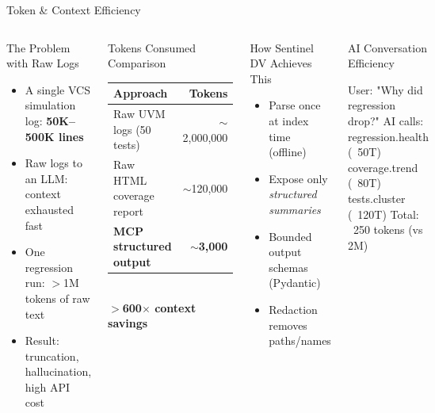 \documentclass[aspectratio=169,t]{beamer}
\begin{document}
\begin{frame}[fragile]{Token \& Context Efficiency}
  \begin{columns}[T]
      \begin{block}{The Problem with Raw Logs}
        \small
        \begin{itemize}
          \item A single VCS simulation log: \textbf{50K--500K lines}
          \item Raw logs to an LLM: context exhausted fast
          \item One regression run: $>$1M tokens of raw text
          \item Result: truncation, hallucination, high API cost
        \end{itemize}
      \end{block}
      \vspace{0.3em}
      \begin{alertblock}{Tokens Consumed Comparison}
        \footnotesize
        \begin{tabular}{lr}
          \toprule
          \textbf{Approach} & \textbf{Tokens} \\
          \midrule
          Raw UVM logs (50 tests) & $\sim$2,000,000 \\
          Raw HTML coverage report & $\sim$120,000 \\
          \textbf{MCP structured output} & \textbf{$\sim$3,000} \\
          \bottomrule
        \end{tabular}\\[2pt]
        \textbf{$>$600$\times$ context savings}
      \end{alertblock}

      \begin{block}{How Sentinel DV Achieves This}
        \small
        \begin{itemize}
          \item Parse once at index time (offline)
          \item Expose only \emph{structured summaries}
          \item Bounded output schemas (Pydantic)
          \item Redaction removes paths/names
        \end{itemize}
      \end{block}
      \vspace{0.2em}
      \begin{exampleblock}{AI Conversation Efficiency}
        \footnotesize
\begin{semiverbatim}\color{white}
User: "Why did regression drop?"
AI calls:
  regression.health (~50T)
  coverage.trend    (~80T)
  tests.cluster    (~120T)
Total: ~250 tokens  (vs 2M)
\end{semiverbatim}
      \end{exampleblock}
  \end{columns}
\end{frame}
\end{document}
